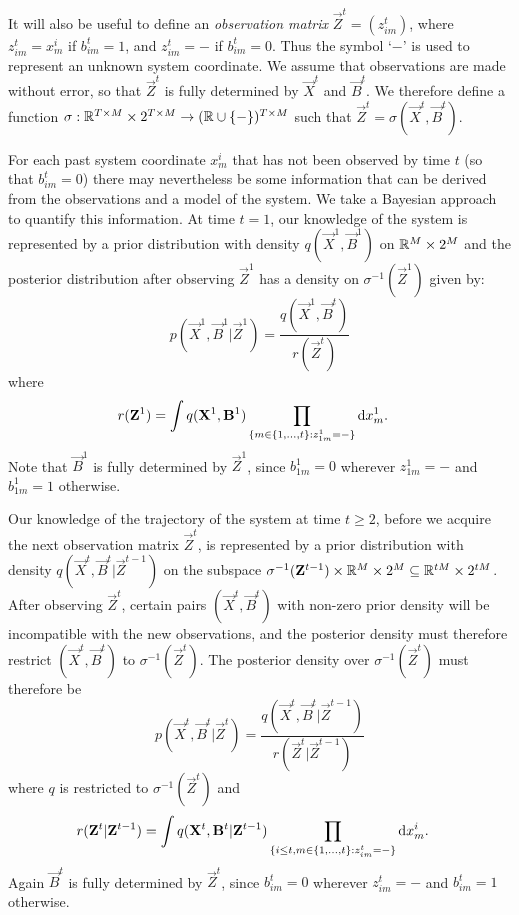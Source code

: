 It will also be useful to define an {\em observation matrix} $\vec{Z}^t = (z^t_{im})$, where $z^t_{im} = x^i_m$ if $b^t_{im} = 1$, and $z^t_{im} = -$ if $b^t_{im} = 0$. Thus the symbol `$-$' is used to represent an unknown system coordinate. We assume that observations are made without error, so that $\vec{Z}^t$ is fully determined by $\vec{X}^t$ and $\vec{B}^t$. We therefore define a function $\sigma: \mathbb R^{T \times M} \times 2^{T \times M} \rightarrow (\mathbb R \cup \{ - \})^{T \times M}$ such that $\vec{Z}^t = \sigma(\vec{X}^t, \vec{B}^t)$.

For each past system coordinate $x^i_m$ that has not been observed by time $t$ (so that $b^t_{im} = 0$) there may nevertheless be some information that can be derived from the observations and a model of the system. We take a Bayesian approach to quantify this information. At time $t=1$, our knowledge of the system is represented by a prior distribution with density $q(\vec{X}^1, \vec{B}^1)$ on $\mathbb R^M \times 2^M$ and the posterior distribution after observing $\vec{Z}^1$ has a density on $\sigma^{-1}(\vec{Z}^1)$ given by:
\begin{equation*}
    p(\vec{X}^1, \vec{B}^1 |\vec{Z}^1) =
        \frac{q(\vec{X}^1, \vec{B}^t)}
        {r(\vec{Z}^t)} 
\end{equation*}
where
\begin{align*}
    r(\mathbf{Z}^1)  &= \int q(\mathbf{X}^1, \mathbf{B}^1) \prod_{ \{m \in \{1, \ldots, t \} : z^1_{1m} = - \} } \mathrm{d} x^1_m.
\end{align*}
Note that $\vec{B}^1$ is fully determined by $\vec{Z}^1$, since $b^1_{1m} = 0$ wherever $z^1_{1m} = -$ and $b^1_{1m} = 1$ otherwise.

Our knowledge of the trajectory of the system at time $t \geq 2$, before we acquire the next observation matrix $\vec{Z}^t$, is represented by a prior distribution with density $q(\vec{X}^t, \vec{B}^t | \vec{Z}^{t-1})$ on the subspace $\sigma^{-1}(\mathbf{Z}^{t-1}) \times \mathbb R^M \times 2^M \subseteq \mathbb R^{tM} \times 2^{tM}$. After observing $\vec{Z}^t$, certain pairs $(\vec{X}^t, \vec{B}^t)$ with non-zero prior density will be incompatible with the new observations, and the posterior density must therefore restrict $(\vec{X}^t, \vec{B}^t)$ to $\sigma^{-1}(\vec{Z}^t)$. The posterior density over $\sigma^{-1}(\vec{Z}^t)$ must therefore be
\begin{equation*}
    p(\vec{X}^t, \vec{B}^t |\vec{Z}^t) =
        \frac{q(\vec{X}^t, \vec{B}^t | \vec{Z}^{t-1})}
        {r(\vec{Z}^t | \vec{Z}^{t-1})} 
\end{equation*}
where $q$ is restricted to $\sigma^{-1}(\vec{Z}^t)$ and
\begin{align*}
    r(\mathbf{Z}^t | \mathbf{Z}^{t-1})  &= \int q(\mathbf{X}^t, \mathbf{B}^t | \mathbf{Z}^{t-1}) \prod_{ \{ i \leq t, m \in \{1, \ldots, t \} : z^t_{im} = - \} } \mathrm{d} x^i_m.
\end{align*}
Again $\vec{B}^t$ is fully determined by $\vec{Z}^t$, since $b^t_{im} = 0$ wherever $z^t_{im} = -$ and $b^t_{im} = 1$ otherwise.

